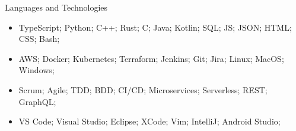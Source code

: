 \documentclass[]{mussocv}
\begin{document}
	\begin{cvsection}{Languages and Technologies}
		\begin{cvsubsection}{}{}{}	
			\begin{itemize}
				\item TypeScript; Python; C++; Rust; C; Java; Kotlin; SQL; JS; JSON; HTML; CSS; Bash;
				\item AWS; Docker; Kubernetes; Terraform; Jenkins; Git; Jira; Linux; MacOS; Windows;
				\item Scrum; Agile; TDD; BDD; CI/CD; Microservices; Serverless; REST; GraphQL;
				\item VS Code; Visual Studio; Eclipse; XCode; Vim; IntelliJ; Android Studio;
			\end{itemize}
		\end{cvsubsection}
	\end{cvsection}
	
\end{document}
